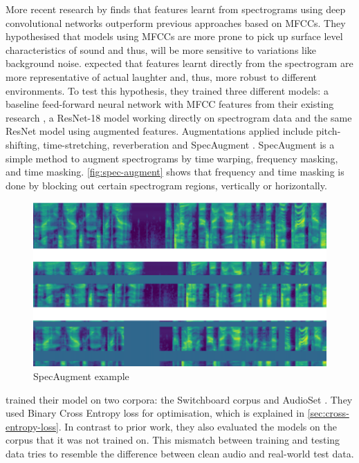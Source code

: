 \documentclass[bsc,frontabs,parskip,deptreport]{infthesis}
\begin{document}
More recent research by \citet{gillick2021robust} finds that features learnt from spectrograms using deep convolutional networks outperform previous approaches based on MFCCs. 
They hypothesised that models using MFCCs are more prone to pick up surface level characteristics of sound and thus, will be more sensitive to variations like background noise.
\citet{gillick2021robust} expected that features learnt directly from the spectrogram are more representative of actual laughter and, thus, more robust to different environments. 
To test this hypothesis, they trained three different models: a baseline feed-forward neural network with MFCC features from their existing research \citep{ryokai2018capturing}, a ResNet-18 \citep{he2016deep} model working directly on spectrogram data and the same ResNet model using augmented features. Augmentations applied include pitch-shifting, time-stretching, reverberation and SpecAugment \citep{park2019specaugment}. SpecAugment is a simple method to augment spectrograms by time warping, frequency masking, and time masking. \autoref{fig:spec-augment} shows that frequency and time masking is done by blocking out certain spectrogram regions, vertically or horizontally. 

\begin{figure}[h!]
    \centering
    \includegraphics[width=13cm]{imgs/examples/spec_augment_example.png}
    \caption{SpecAugment example}
    \label{fig:spec-augment}
\end{figure}

\citet{gillick2021robust} trained their model on two corpora: the Switchboard corpus \citep{switchboard-corpus} and AudioSet \citep{googleaudioset}. They used Binary Cross Entropy loss for optimisation, which is explained in \autoref{sec:cross-entropy-loss}.
In contrast to prior work, they also evaluated the models on the corpus that it was not trained on.
This mismatch between training and testing data tries to resemble the difference between clean audio and real-world test data.
\end{document}
